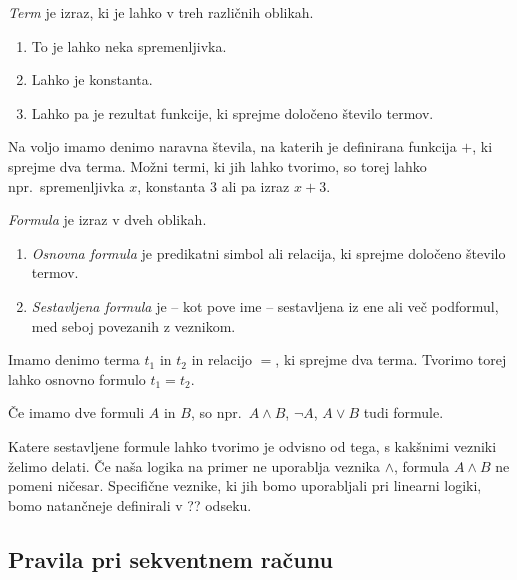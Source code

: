 \begin{definicija}
    \emph{Term} je izraz, ki je lahko v treh različnih oblikah.
    \begin{enumerate}
        \item To je lahko neka spremenljivka.
        \item Lahko je konstanta.
        \item Lahko pa je rezultat funkcije, ki sprejme določeno število termov.
    \end{enumerate}
\end{definicija}
\begin{primer*}
    Na voljo imamo denimo naravna števila, na katerih je definirana funkcija $+$, ki sprejme dva terma. Možni termi, ki jih lahko tvorimo, so torej lahko npr.\ spremenljivka $x$, konstanta $3$ ali pa izraz $x+3$.
\end{primer*}

\begin{definicija}
	\emph{Formula} je izraz v dveh oblikah.
	\begin{enumerate}
        \item \emph{Osnovna formula} je predikatni simbol ali relacija, ki sprejme določeno število termov.
        \item \emph{Sestavljena formula} je -- kot pove ime -- sestavljena iz ene ali več podformul, med seboj povezanih z veznikom.
	\end{enumerate}
\end{definicija}
\begin{primer*}
    Imamo denimo terma $t_1$ in $t_2$ in relacijo $=$, ki sprejme dva terma. Tvorimo torej lahko osnovno formulo $t_1=t_2$.
\end{primer*}
\begin{primer*}
    Če imamo dve formuli $A$ in $B$, so npr.\ $A \land B$, $\neg A$, $A \lor B$ tudi formule.
\end{primer*}
Katere sestavljene formule lahko tvorimo je odvisno od tega, s kakšnimi vezniki želimo delati. Če naša logika na primer ne uporablja veznika $\land$, formula $A \land B$ ne pomeni ničesar. Specifične veznike, ki jih bomo uporabljali pri linearni logiki, bomo natančneje definirali v ?? odseku.

\subsection{Pravila pri sekventnem računu}

